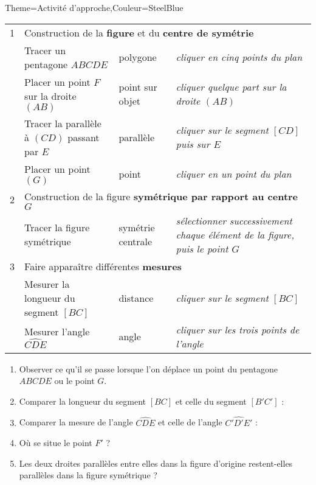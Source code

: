 \begin{Maquette}[Cours]{Theme={Activité d'approche},Couleur={SteelBlue}}
\begin{AActivite}
            \begin{center}
               {
               \begin{tabular}{|c|p{6cm}|p{2.6cm}|>{\itshape\footnotesize}p{5cm}|}
                  \hline
                  1 & \multicolumn{3}{l|}{Construction de la {\bf figure} et du {\bf centre de symétrie}} \\
                  & Tracer un pentagone $ABCDE$ & polygone & cliquer en cinq points du plan \\
                  & Placer un point $F$ sur la droite $(AB)$ & point sur objet & cliquer quelque part sur la droite $(AB)$ \\
                  & Tracer la parallèle à $(CD)$ passant par $E$ & parallèle & cliquer sur le segment $[CD]$ puis sur $E$ \\
                  & Placer un point $(G)$ & point & cliquer en un point du plan \\
               \hline
                  2 & \multicolumn{3}{l|}{Construction de la figure {\bf symétrique par rapport au centre} $G$} \\
                  & Tracer la figure symétrique & symétrie centrale & sélectionner successivement chaque élément de la figure, puis le point $G$ \\
                  \hline
                  3 & \multicolumn{3}{l|}{Faire apparaître différentes {\bf mesures}} \\
                  & Mesurer la longueur du segment $[BC]$ & distance & cliquer sur le segment $[BC]$ \\
                  & Mesurer l'angle $\widehat{CDE}$ & angle & cliquer sur les trois points de l'angle \\
               \hline
               \end{tabular}}
            \end{center}
            \begin{enumerate}[resume]
               \item Observer ce qu'il se passe lorsque l'on déplace un point du pentagone $ABCDE$ ou le point $G$.
               \item Comparer la longueur du segment $[BC]$ et celle du segment $[B'C']$ : \pointilles
               \item Comparer la mesure de l'angle $\widehat{CDE}$ et celle de l'angle $\widehat{C'D'E'}$ : \pointilles
               \item Où se situe le point $F'$ ? \pointilles
               \item Les deux droites parallèles entre elles dans la figure d'origine restent-elles parallèles dans la figure symétrique ? \pointilles
         \end{enumerate}

      \end{AActivite}

\end{Maquette}


